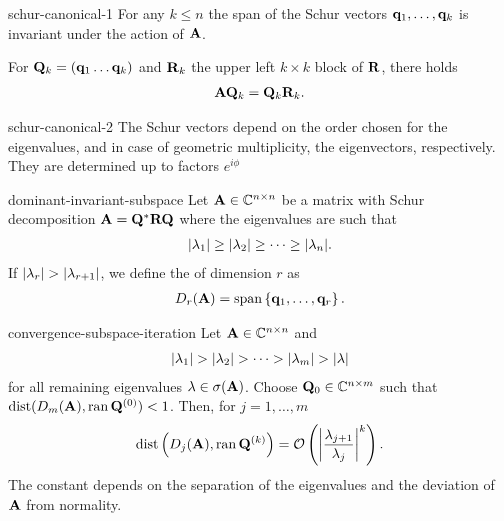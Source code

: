 \begin{Lemma}{schur-canonical-1}
  For any $k\le n$ the span of the Schur vectors
  $\vq_1,\dots,\vq_k$ is invariant under the action of $\mata$.

  For $\matq_k = (\vq_1\dots\vq_k)$ and $\matr_k$ the upper left $k\times k$ block of $\matr$, there holds
  \begin{gather}
    \mata\matq_k = \matq_k \matr_k.
  \end{gather}
\end{Lemma}

\begin{Lemma}{schur-canonical-2}
  The Schur vectors depend on the order chosen for the eigenvalues,
  and in case of geometric multiplicity, the eigenvectors,
  respectively. They are determined up to factors $e^{i\phi}$
\end{Lemma}

\begin{Definition}{dominant-invariant-subspace}
  Let $\mata\in\Cnn$ be a matrix with Schur decomposition
  $\mata = \matq^*\matr\matq$ where the eigenvalues are such that
  \begin{gather}
    \abs{\lambda_1}\ge\abs{\lambda_2}\ge\dots\ge\abs{\lambda_n}.
  \end{gather}
  If $\abs{\lambda_r}>\abs{\lambda_{r+1}}$, we define the
   of dimension $r$ as
  \begin{gather}
    D_r(\mata) = \spann{\vq_1,\dots,\vq_r}.
  \end{gather}
\end{Definition}

\begin{Theorem}{convergence-subspace-iteration}
  Let $\mata\in\Cnn$ and
  \begin{gather}
    \abs{\lambda_1} >
    \abs{\lambda_2}>\dots>\abs{\lambda_m}>\abs{\lambda}
  \end{gather}
  for all remaining eigenvalues $\lambda\in\sigma(\mata)$. Choose
  $\matq_0 \in \C^{n\times m}$ such that
  $\dist(D_m(\mata),\ran{\matq^{(0)}}) < 1$. Then, for $j=1,\dots,m$
  \begin{gather}
    \dist\left(D_j(\mata),\ran{\matq^{(k)}}\right)
    = \bigo \left(\abs*{\frac{\lambda_{j+1}}{\lambda_j}}^k\right).
  \end{gather}
  The constant depends on the separation of the eigenvalues and the deviation of $\mata$ from normality.
\end{Theorem}

